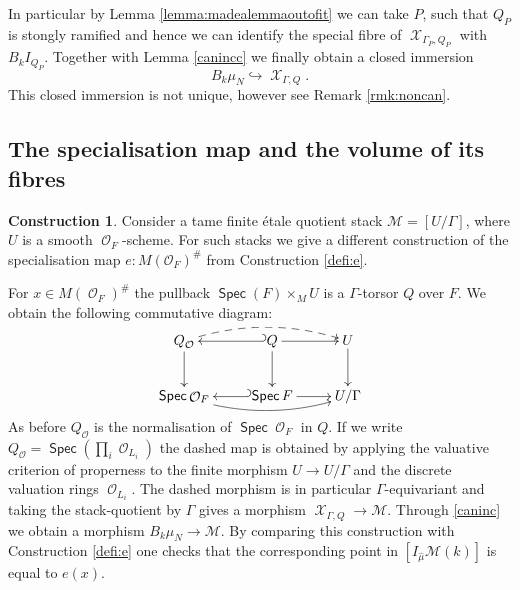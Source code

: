 \documentclass{article}
\DeclareMathOperator{\Xc}{\mathcal{X}}
\newcommand{\Mc}{\mathcal{M}}
\DeclareMathOperator{\Spec}{\mathsf{Spec}}
\DeclareMathOperator{\Oo}{\mathcal{O}}
\newcommand{\CM}{{\mathcal M}}
\newcommand{\CO}{{\mathcal O}}
\theoremstyle{definition}
\newtheorem{construction}[definition]{Construction}
\theoremstyle{plain}
\begin{document}
In particular by Lemma \ref{lemma:madealemmaoutofit} we can take $P$, such that $Q_P$ is stongly ramified and hence we can identify the special fibre of $\Xc_{\Gamma_P,Q_P}$ with $B_{k}I_{Q_P}$. Together with Lemma \ref{canincc} we finally obtain a closed immersion 
\begin{equation}\label{caninc} B_{k}\mu_N \hookrightarrow   \Xc_{\Gamma,Q}.  \end{equation}
This closed immersion is not unique, however see Remark \ref{rmk:noncan}.



\subsection{The specialisation map and the volume of its fibres}\label{sub:e} 


\begin{construction}\label{constrspe}
Consider a tame finite \'etale quotient stack $\CM=[U/\Gamma]$, where $U$ is a smooth $\Oo_F$-scheme. For such stacks we give a different construction of the specialisation map $e\colon M(\CO_F)^\#$ from Construction \ref{defi:e}.

For $x \in M(\Oo_F)^\#$ the pullback $\Spec(F) \times_{M} U$ is a $\Gamma$-torsor $Q$ over $F$. 
We obtain the following commutative diagram:
\[
\xymatrix{
Q_{\Oo} \ar[d] \ar@/^10pt/@{-->}[rr] & \ar@{_(->}[l] Q \ar[r] \ar[d] & U \ar[d] \\
\Spec \Oo_F  \ar@/_10pt/[rr] &  \ar@{_(->}[l]  \Spec F \ar[r] & U/\Gamma
}
\]
As before $Q_{\Oo}$ is the normalisation of $\Spec \Oo_F$ in $Q$. If we write $Q_{\Oo} = \Spec(\prod_i \Oo_{L_i})$ the dashed map is obtained by applying the valuative criterion of properness to the finite morphism $U \to U/\Gamma$ and the discrete valuation rings $\Oo_{L_i}$. The dashed morphism is in particular $\Gamma$-equivariant and taking the stack-quotient by $\Gamma$ gives a morphism $\Xc_{\Gamma,Q} \to \Mc$. Through \eqref{caninc} we obtain a morphism $B_k\mu_N \to \Mc$. By comparing this construction with Construction \ref{defi:e} one checks that the corresponding point in $[I_{\hat{\mu}}\Mc(k)]$ is equal to $e(x)$. 
\end{construction}
\end{document}
